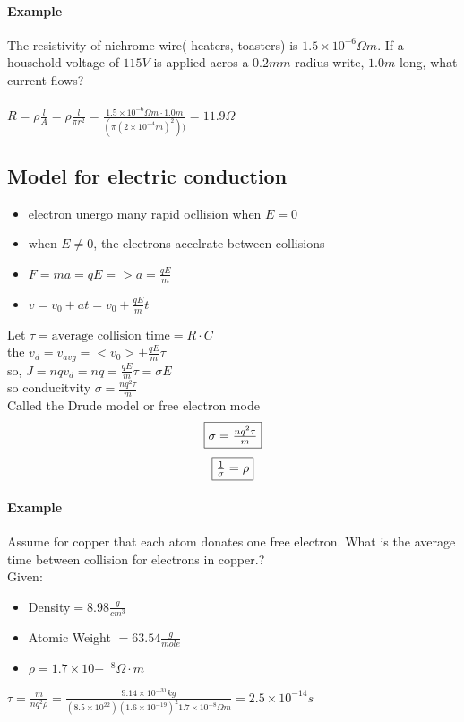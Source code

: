 \documentclass{article}
\begin{document}
    \paragraph{Example} The resistivity of nichrome wire( heaters, toasters) is $1.5 \times 10^{-6}\Omega m$. 
    If a household voltage of $115V$ is applied acros a $0.2mm$ radius write, $1.0m$ long, what current flows?
    \paragraph{}$R = \rho \frac{l}{A} = \rho \frac{l}{\pi r^2} = \frac{1.5 \times 10^{-6}\Omega m \cdot 1.0 m}{(\pi (2\times 10^{-4}m)^2))} = 11.9 \Omega$    
   
    \subsection{Model for electric conduction}
    \begin{itemize}
        \item electron unergo many rapid ocllision when  $E = 0$
        \item when $E \neq 0$, the electrons accelrate between collisions
        \item $F = ma = qE => a = \frac{qE}{m}$
        \item $v = v_0 + at= v_0 + \frac{qE}{m}t $
    \end{itemize}
    Let $\tau = \text{average collision time} = R\cdot C$\\
    the  $v_d = v_{avg} = <v_0> + \frac{qE}{m}\tau$\\
    so, $J = nqv_d = nq = \frac{qE}{m}\tau = \sigma E$\\
    so conducitvity $\sigma = \frac{nq^2\tau}{m}$\\
    Called the Drude model or free electron mode\\
    $$\boxed{$$\sigma = \frac{nq^2 \tau}{m}$$}$$
    $$\boxed{$$\frac{1}{\sigma} = \rho$$}$$
    \paragraph{Example} Assume for copper that each atom donates one free electron. What is the average time between collision for electrons in copper.?
    \\Given: 
    \begin{itemize}
        \item Density$ = 8.98\frac{g}{cm^3}$
        \item Atomic Weight $ = 63.54\frac{g}{mole}$
        \item $\rho = 1.7 \times 10-^{-8}\Omega\cdot m$
    \end{itemize}
    $\tau = \frac{m}{nq^2\rho}=\frac{9.14 \times 10^{-31}kg}{(8.5\times10^22 ) (1.6\times10^{-19})^2 1.7\times10^{-8}\Omega m} = 2.5\times10^{-14}s$
\end{document}
